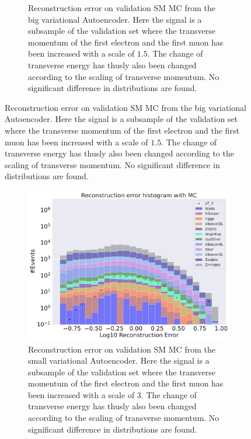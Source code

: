 \begin{figure}[h!]
\begin{subfigure}{.45\textwidth}
        \caption{Reconstruction error on validation SM MC from the big variational Autoencoder. Here the signal is a subsample of the validation 
        set where the transverse momentum of the first electron and the first muon has been increased with a scale of $1.5$. The change of transverse 
        energy has thusly also been changed according to the scaling of transverse momentum. No significant difference in distributions are found. }
        \label{fig:VAE_big_pt_1_5}
    \end{subfigure}
    \hfill 
    \label{fig:VAE_big_small_pt_1_5}
\end{figure}

\begin{figure}[h!]
    \centering
    \begin{subfigure}{.45\textwidth}
        \includegraphics[width=\textwidth]{Figures/VAE_testing/small/b_data_recon_big_rm3_feats_sig_pT_3.pdf}
        \caption{Reconstruction error on validation SM MC from the small variational Autoencoder. Here the signal is a subsample of the validation 
        set where the transverse momentum of the first electron and the first muon has been increased with a scale of $3$. The change of transverse 
        energy has thusly also been changed according to the scaling of transverse momentum. No significant difference in distributions are found. }
        \label{fig:VAE_small_pt_3}
    \end{subfigure}
    \hfill 
    \begin{subfigure}{.45\textwidth}

\end{subfigure}
\end{figure}
